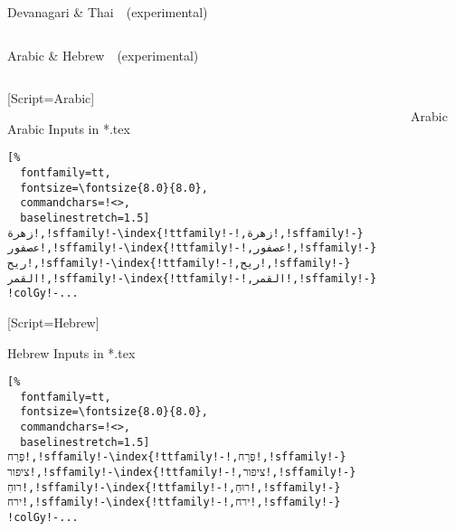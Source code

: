\documentclass[aspectratio=169,10pt]{beamer}
\begin{document}
\begin{frame}[fragile]{Devanagari \& Thai~~{\scriptsize (experimental)}}
\begin{columns}
\end{columns}

\end{frame}



\setmonofont{Noto Sans Mono}
\begin{frame}[fragile]{Arabic \& Hebrew~~{\scriptsize (experimental)}}

\begin{columns}
\begin{column}{50mm}

\setmonofont{DejaVu Sans}[Script=Arabic]
\setmainfont{Noto Sans Mono}
\setsansfont{Noto Sans}
\begin{exampleblock}{Arabic Inputs in *.tex}
\begin{Verbatim}[%
  fontfamily=tt,
  fontsize=\fontsize{8.0}{8.0},
  commandchars=!<>,
  baselinestretch=1.5]
زهرة!,!sffamily!-\index{!ttfamily!-!,زهرة!,!sffamily!-}
عصفور!,!sffamily!-\index{!ttfamily!-!,عصفور!,!sffamily!-}
ريح!,!sffamily!-\index{!ttfamily!-!,ريح!,!sffamily!-}
القمر!,!sffamily!-\index{!ttfamily!-!,القمر!,!sffamily!-}
!colGy!-...
\end{Verbatim}
\end{exampleblock}

\setmonofont{DejaVu Sans}[Script=Hebrew]
\setmainfont{Noto Sans Mono}
\setsansfont{Noto Sans}
\begin{exampleblock}{Hebrew Inputs in *.tex}
\begin{Verbatim}[%
  fontfamily=tt,
  fontsize=\fontsize{8.0}{8.0},
  commandchars=!<>,
  baselinestretch=1.5]
פֶּרַח!,!sffamily!-\index{!ttfamily!-!,פֶּרַח!,!sffamily!-}
ציפור!,!sffamily!-\index{!ttfamily!-!,ציפור!,!sffamily!-}
רוּחַ!,!sffamily!-\index{!ttfamily!-!,רוּחַ!,!sffamily!-}
ירח!,!sffamily!-\index{!ttfamily!-!,ירח!,!sffamily!-}
!colGy!-...
\end{Verbatim}
\end{exampleblock}

\end{column}

\begin{column}{79mm}

\begin{columns}
\begin{column}{39mm}
\begin{center}
\\[2mm]%
Arabic
\end{center}
\end{column}


\end{columns}
\end{column}
\end{columns}
\end{frame}
\end{document}
